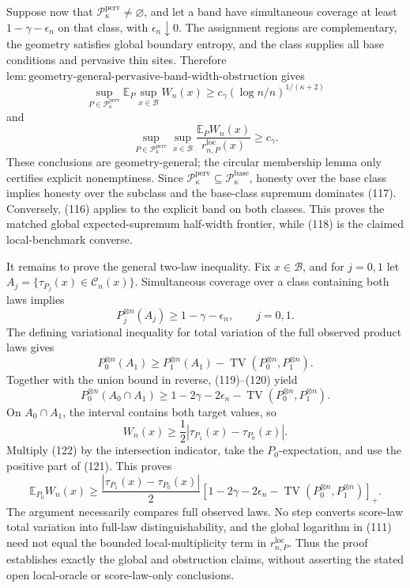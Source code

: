 Suppose now that \(\mathcal P_\kappa^{\mathrm{perv}}\ne\varnothing\),
and let a band have simultaneous coverage at least
\(1-\gamma-\epsilon_n\) on that class, with \(\epsilon_n\downarrow0\).
The assignment regions are complementary, the geometry satisfies global
boundary entropy, and the class supplies all base conditions and
pervasive thin sites.  Therefore
\(\mathrm{lem:geometry\text{-}general\text{-}pervasive\text{-}band\text{-}width\text{-}obstruction}\)
gives
\[
 \sup_{P\in\mathcal P_\kappa^{\mathrm{perv}}}
 \mathbb E_P\sup_{x\in\mathcal B}W_n(x)
 \ge c_\gamma(\log n/n)^{1/(\kappa+2)}
 \tag{117}
\]
and
\[
 \sup_{P\in\mathcal P_\kappa^{\mathrm{perv}}}
 \sup_{x\in\mathcal B}
 \frac{\mathbb E_PW_n(x)}{r_{n,P}^{\mathrm{loc}}(x)}
 \ge c_\gamma.
 \tag{118}
\]
These conclusions are geometry-general; the circular membership lemma
only certifies explicit nonemptiness.  Since
\(\mathcal P_\kappa^{\mathrm{perv}}\subseteq
\mathcal P_\kappa^{\mathrm{base}}\), honesty over the base class implies
honesty over the subclass and the base-class supremum dominates (117).
Conversely, (116) applies to the explicit band on both classes.  This
proves the matched global expected-supremum half-width frontier, while
(118) is the claimed local-benchmark converse.

It remains to prove the general two-law inequality.  Fix
\(x\in\mathcal B\), and for \(j=0,1\) let
\(A_j=\{\tau_{P_j}(x)\in\mathcal C_n(x)\}\).  Simultaneous coverage over
a class containing both laws implies
\[
 P_j^{\otimes n}(A_j)\ge1-\gamma-\epsilon_n,
 \qquad j=0,1.
 \tag{119}
\]
The defining variational inequality for total variation of the full
observed product laws gives
\[
 P_0^{\otimes n}(A_1)
 \ge P_1^{\otimes n}(A_1)
 -\operatorname{TV}(P_0^{\otimes n},P_1^{\otimes n}).
 \tag{120}
\]
Together with the union bound in reverse, (119)--(120) yield
\[
 P_0^{\otimes n}(A_0\cap A_1)
 \ge1-2\gamma-2\epsilon_n
 -\operatorname{TV}(P_0^{\otimes n},P_1^{\otimes n}).
 \tag{121}
\]
On \(A_0\cap A_1\), the interval contains both target values, so
\[
 W_n(x)\ge\frac12|\tau_{P_1}(x)-\tau_{P_0}(x)|.
 \tag{122}
\]
Multiply (122) by the intersection indicator, take the
\(P_0\)-expectation, and use the positive part of (121).  This proves
\[
 \mathbb E_{P_0}W_n(x)\ge
 \frac{|\tau_{P_1}(x)-\tau_{P_0}(x)|}{2}
 \left[1-2\gamma-2\epsilon_n-
 \operatorname{TV}(P_0^{\otimes n},P_1^{\otimes n})\right]_+.
\]
The argument necessarily compares full observed laws.  No step converts
score-law total variation into full-law distinguishability, and the
global logarithm in (111) need not equal the bounded local-multiplicity
term in \(r_{n,P}^{\mathrm{loc}}\).  Thus the proof establishes exactly
the global and obstruction claims, without asserting the stated open
local-oracle or score-law-only conclusions.